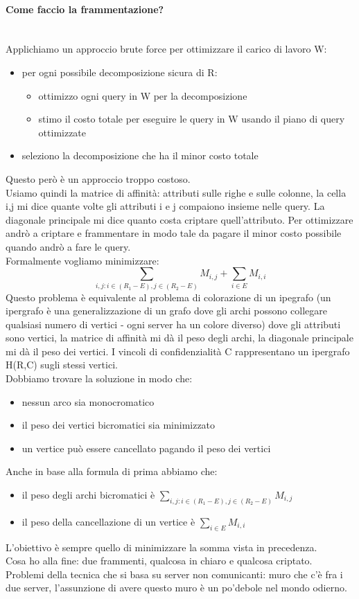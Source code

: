 \paragraph{Come faccio la frammentazione?}\\
Applichiamo un approccio brute force per ottimizzare il carico di lavoro W:
\begin{itemize}
    \item per ogni possibile decomposizione sicura di R:
    \begin{itemize}
        \item ottimizzo ogni query in W per la decomposizione
        \item stimo il costo totale per eseguire le query in W usando il piano di query ottimizzate
    \end{itemize}
    \item seleziono la decomposizione che ha il minor costo totale
\end{itemize}
Questo però è un approccio troppo costoso.\\
Usiamo quindi la matrice di affinità: attributi sulle righe e sulle colonne, la cella i,j mi dice quante volte gli attributi i e j compaiono insieme nelle query. La diagonale principale mi dice quanto costa criptare quell'attributo. Per ottimizzare andrò a criptare e frammentare in modo tale da pagare il minor costo possibile quando andrò a fare le query.\\
Formalmente vogliamo minimizzare:
\[\sum_{i,j: i \in (R_1 - E), j \in (R_2-E)} M_{i,j} + \sum_{i \in E}M_{i,i}\]
Questo problema è equivalente al problema di colorazione di un ipegrafo (un ipergrafo è una generalizzazione di un grafo dove gli archi possono collegare qualsiasi numero di vertici - ogni server ha un colore diverso) dove gli attributi sono vertici, la matrice di affinità mi dà il peso degli archi, la diagonale principale mi dà il peso dei vertici. I vincoli di confidenzialità C rappresentano un ipergrafo H(R,C) sugli stessi vertici.\\
Dobbiamo trovare la soluzione in modo che:
\begin{itemize}
    \item nessun arco sia monocromatico
    \item il peso dei vertici bicromatici sia minimizzato
    \item un vertice può essere cancellato pagando il peso dei vertici
\end{itemize}
Anche in base alla formula di prima abbiamo che:
\begin{itemize}
    \item il peso degli archi bicromatici è \(\sum_{i,j: i \in (R_1 - E), j \in (R_2-E)} M_{i,j} \)
    \item il peso della cancellazione di un vertice è \(\sum_{i \in E}M_{i,i}\)
\end{itemize}
L'obiettivo è sempre quello di minimizzare la somma vista in precedenza.\\
Cosa ho alla fine: due frammenti, qualcosa in chiaro e qualcosa criptato.\\
Problemi della tecnica che si basa su server non comunicanti: muro che c’è fra i due server, l’assunzione di avere questo muro è un po’debole nel mondo odierno.


